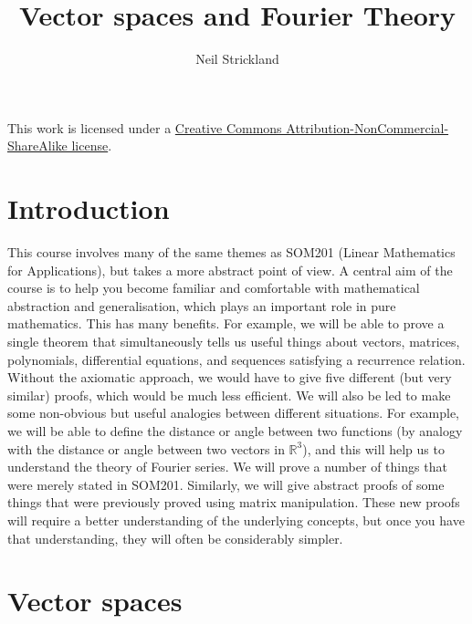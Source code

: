 \documentclass{amsart}
\newcommand{\R}         {{\mathbb{R}}}
\renewcommand{\:}       {\colon}
\theoremstyle{definition}
\begin{document}
\title{Vector spaces and Fourier Theory}
\author{Neil Strickland}

\maketitle

\begin{center}
 This work is licensed under a 
 \href{https://creativecommons.org/licenses/by-nc-sa/3.0/deed.en}{
  Creative Commons Attribution-NonCommercial-ShareAlike license}.
 
 \bigskip

 \doclicenseImage 
\end{center}

\section{Introduction}
\label{sec-intro}

This course involves many of the same themes as SOM201
(Linear Mathematics for Applications), but takes a more
abstract point of view.  A central aim of the course is to
help you become familiar and comfortable with mathematical
abstraction and generalisation, which plays an important
role in pure mathematics.  This has many benefits.  For
example, we will be able to prove a single theorem that
simultaneously tells us useful things about vectors,
matrices, polynomials, differential equations, and sequences
satisfying a recurrence relation.  Without the axiomatic
approach, we would have to give five different (but very
similar) proofs, which would be much less efficient.  We
will also be led to make some non-obvious but useful
analogies between different situations.  For example, we
will be able to define the distance or angle between two
functions (by analogy with the distance or angle between two
vectors in $\R^3$), and this will help us to understand the
theory of Fourier series.  We will prove a number of things
that were merely stated in SOM201.  Similarly, we will give
abstract proofs of some things that were previously proved
using matrix manipulation.  These new proofs will require a
better understanding of the underlying concepts, but once
you have that understanding, they will often be considerably
simpler. 

\section{Vector spaces}
\label{sec-vector-spaces}
\end{document}
